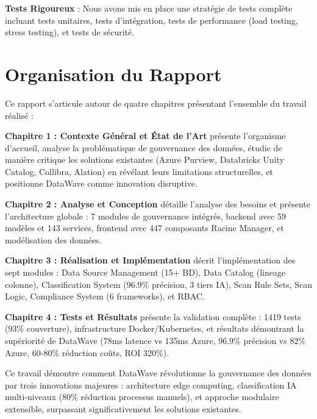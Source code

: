 \textbf{Tests Rigoureux} : Nous avons mis en place une stratégie de tests complète incluant tests unitaires, tests d'intégration, tests de performance (load testing, stress testing), et tests de sécurité.

\section*{Organisation du Rapport}

Ce rapport s'articule autour de quatre chapitres présentant l'ensemble du travail réalisé :

\textbf{Chapitre 1 : Contexte Général et État de l'Art} présente l'organisme d'accueil, analyse la problématique de gouvernance des données, étudie de manière critique les solutions existantes (Azure Purview, Databricks Unity Catalog, Collibra, Alation) en révélant leurs limitations structurelles, et positionne DataWave comme innovation disruptive.

\textbf{Chapitre 2 : Analyse et Conception} détaille l'analyse des besoins et présente l'architecture globale : 7 modules de gouvernance intégrés, backend avec 59 modèles et 143 services, frontend avec 447 composants Racine Manager, et modélisation des données.

\textbf{Chapitre 3 : Réalisation et Implémentation} décrit l'implémentation des sept modules : Data Source Management (15+ BD), Data Catalog (lineage colonne), Classification System (96.9\% précision, 3 tiers IA), Scan Rule Sets, Scan Logic, Compliance System (6 frameworks), et RBAC.

\textbf{Chapitre 4 : Tests et Résultats} présente la validation complète : 1419 tests (93\% couverture), infrastructure Docker/Kubernetes, et résultats démontrant la supériorité de DataWave (78ms latence vs 135ms Azure, 96.9\% précision vs 82\% Azure, 60-80\% réduction coûts, ROI 320\%).

Ce travail démontre comment DataWave révolutionne la gouvernance des données par trois innovations majeures : architecture edge computing, classification IA multi-niveaux (80\% réduction processus manuels), et approche modulaire extensible, surpassant significativement les solutions existantes.
